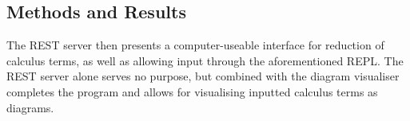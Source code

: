 \subsection{Methods and Results}
    The REST server then presents a computer-useable interface for reduction of calculus terms, as well as allowing input through the aforementioned REPL.
    The REST server alone serves no purpose, but combined with the diagram visualiser completes the program and allows for visualising inputted calculus terms as diagrams.
